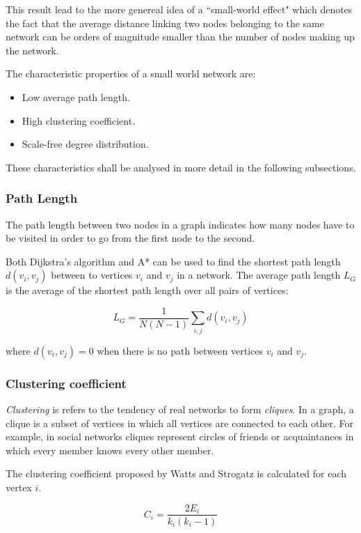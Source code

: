 \documentclass[a4paper,11pt,titlepage]{article}
\begin{document}
This result lead to the more genereal idea of a ``small-world effect" which
denotes the fact that the average distance linking two nodes belonging to the
same network can be orders of magnitude smaller than the number of nodes making
up the network. \cite{complexAdapt}

The characteristic properties of a small world network are:

\begin{itemize}
\item Low average path length.
\item High clustering coefficient.
\item Scale-free degree distribution.
\end{itemize}

These characteristics shall be analysed in more detail in the following subsections.

\subsubsection{Path Length}

The path length between two nodes in a graph indicates how many nodes
have to be visited in order to go from the first node to the second.

Both Dijkstra's algorithm and A* can be used to find the shortest path length
$d(v_i, v_j)$ between to vertices $v_i$ and $v_j$ in a network. The average
path length $L_G$ is the average of the shortest path length over all pairs of
vertices:

\[ L_G = \frac{1}{N(N-1)} \sum_{i, j} d(v_i, v_j) \]

where $d(v_i, v_j) = 0$ when there is no path between vertices $v_i$ and $v_j$.

\subsubsection{Clustering coefficient}

\emph{Clustering} is refers to the tendency of real networks to form
\emph{cliques}. In a graph, a clique is a subset of vertices in which all
vertices are connected to each other. For example, in social networks
cliques represent circles of friends or acquaintances in which every
member knows every other member.

The clustering coefficient proposed by Watts and Strogatz is calculated for each
vertex $i$.

\[ C_i = \frac{2E_i}{k_i(k_i-1)} \]
\end{document}
